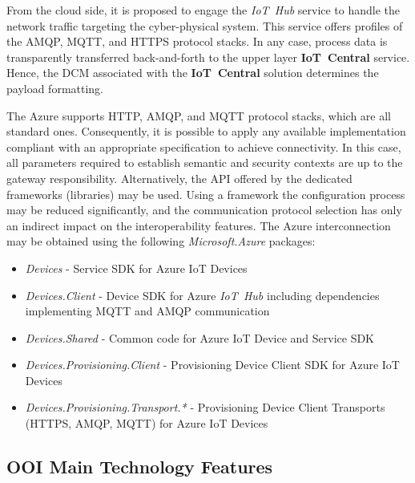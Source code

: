 \documentclass[runningheads]{llncs}
\begin{document}
From the cloud side, it is proposed to engage the \emph{IoT\ Hub} service to handle the network traffic targeting the cyber-physical system. This service offers profiles of the AMQP, MQTT, and HTTPS protocol stacks. In any case, process data is transparently transferred back-and-forth to the upper layer \textbf{IoT\ Central} service. Hence, the DCM associated with the \textbf{IoT\ Central} solution determines the payload formatting.

The Azure supports HTTP, AMQP, and MQTT protocol stacks, which are all standard ones. Consequently, it is possible to apply any available implementation compliant with an appropriate specification to achieve connectivity. In this case, all parameters required to establish semantic and security contexts are up to the gateway responsibility. Alternatively, the API offered by the dedicated frameworks (libraries) may be used. Using a framework the configuration process may be reduced significantly, and the communication protocol selection has only an indirect impact on the interoperability features. The Azure interconnection may be obtained using the following \emph{Microsoft.Azure} packages:

\begin{itemize}
      \item \emph{Devices} - Service SDK for Azure IoT Devices
      \item \emph{Devices.Client} - Device SDK for Azure \emph{IoT\ Hub} including dependencies implementing MQTT and AMQP communication
      \item \emph{Devices.Shared} - Common code for Azure IoT Device and Service SDK
      \item \emph{Devices.Provisioning.Client} - Provisioning Device Client SDK for Azure IoT Devices
      \item \emph{Devices.Provisioning.Transport.*} - Provisioning Device Client Transports (HTTPS, AMQP, MQTT) for Azure IoT Devices
\end{itemize}

\subsection{OOI Main Technology Features}\label{ooi-main-technology-features}
\end{document}
